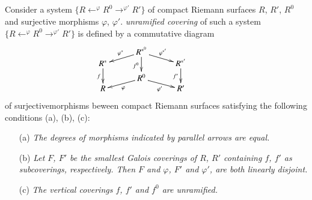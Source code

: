 \subsection{}\label{art6-subsec3.1}
Consider a system $\{R {\displaystyle{\mathop{\longleftarrow}^\varphi}} R^0  {\displaystyle{\mathop{\longrightarrow}^{\varphi'}}} R' \}$ of compact Riemann surfaces $R$, $R'$, $R^0$ and surjective morphisms $\varphi$, $\varphi'$. \textit{unramified covering} of such a system $\{R {\displaystyle{\mathop{\longleftarrow}^\varphi}} R^0  {\displaystyle{\mathop{\longrightarrow}^{\varphi'}}} R' \}$ is defined by a commutative diagram
\setcounter{equation}{0}
\begin{equation}
\vcenter{
\xymatrix@R=-0.05cm@C=1cm{
& R^{\ast^0} \ar[dr]^{\varphi^{\ast'}} \ar[dl]_{\varphi^\ast} \ar[ddd]_{f^0} & \\
R^\ast \ar[ddd]_{f} &&  R^{\ast'} \ar[ddd]_{f'}\\
& & &\\
& R^0 \ar[dr]_{\varphi'}  \ar[dl]^{\varphi}& \\
R & & R'}
}\label{art6-eq3.1.1}
\end{equation}
of surjective\pageoriginale morphisms beween compact Riemann surfaces satisfying the following conditions (a), (b), (c):
\begin{itemize}
\item[(a)] \textit{The degrees of morphisms indicated by parallel arrows are equal.}

\item[(b)] \textit{Let $F$, $F'$ be the smallest Galois coverings of $R$, $R'$ containing $f$, $f'$ as subcoverings, respectively. Then $F$ and $\varphi$, $F'$ and $\varphi'$, are both linearly disjoint.}

\item[(c)] \textit{The vertical coverings $f$, $f'$ and $f^0$ are unramified.}
\end{itemize}

